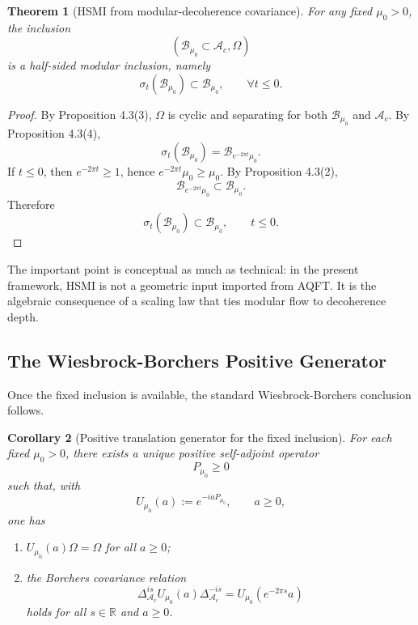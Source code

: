 \documentclass[12pt]{article}
\newtheorem{theorem}{Theorem}[section]
\newtheorem{corollary}[theorem]{Corollary}
\theoremstyle{definition}
\theoremstyle{remark}
\newcommand{\tightlist}{%
  \setlength{\itemsep}{0pt}\setlength{\parskip}{0pt}}
\begin{document}
\begin{theorem}[HSMI from modular-decoherence covariance]\label{thm:4.4}
For any fixed \(\mu_0>0\), the inclusion \[
(\mathcal{B}_{\mu_0}\subset \mathcal{A}_c,\Omega)
\] is a half-sided modular inclusion, namely \[
\sigma_t(\mathcal{B}_{\mu_0})\subset \mathcal{B}_{\mu_0},
\qquad
\forall t\le 0.
\]
\end{theorem}

\begin{proof}
By Proposition 4.3(3), \(\Omega\) is cyclic and separating for both
\(\mathcal{B}_{\mu_0}\) and \(\mathcal{A}_c\). By Proposition 4.3(4), \[
\sigma_t(\mathcal{B}_{\mu_0})
=
\mathcal{B}_{e^{-2\pi t}\mu_0}.
\] If \(t\le 0\), then \(e^{-2\pi t}\ge 1\), hence
\(e^{-2\pi t}\mu_0\ge \mu_0\). By Proposition 4.3(2), \[
\mathcal{B}_{e^{-2\pi t}\mu_0}\subset \mathcal{B}_{\mu_0}.
\] Therefore \[
\sigma_t(\mathcal{B}_{\mu_0})\subset \mathcal{B}_{\mu_0},
\qquad t\le 0.
\]
\end{proof}

The important point is conceptual as much as technical: in the present
framework, HSMI is not a geometric input imported from AQFT\@. It is the
algebraic consequence of a scaling law that ties modular flow to
decoherence depth.

\subsection{The Wiesbrock-Borchers Positive
Generator}\label{the-wiesbrock-borchers-positive-generator}

Once the fixed inclusion is available, the standard Wiesbrock-Borchers
conclusion follows.

\begin{corollary}[Positive translation generator for the fixed
inclusion]\label{cor:4.5}
For each fixed \(\mu_0>0\), there exists a unique positive self-adjoint
operator \[
P_{\mu_0}\ge 0
\] such that, with \[
U_{\mu_0}(a):=e^{-iaP_{\mu_0}},
\qquad
a\ge 0,
\] one has

\begin{enumerate}
\def\labelenumi{\arabic{enumi}.}
\tightlist
\item
  \(U_{\mu_0}(a)\Omega=\Omega\) for all \(a\ge 0\);
\item
  the Borchers covariance relation \[
  \Delta_{\mathcal{A}_c}^{is}U_{\mu_0}(a)\Delta_{\mathcal{A}_c}^{-is}
  =
  U_{\mu_0}(e^{-2\pi s}a)
  \] holds for all \(s\in\mathbb{R}\) and \(a\ge 0\).
\end{enumerate}
\end{corollary}
\end{document}
